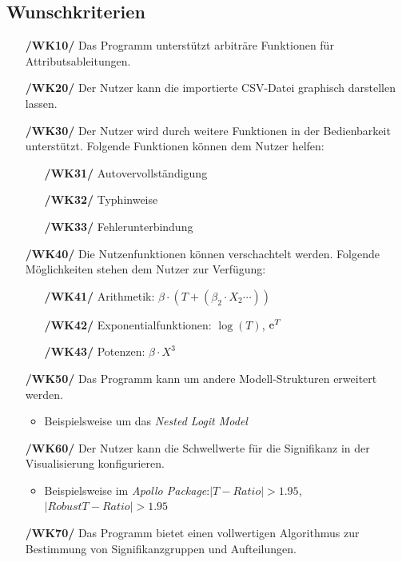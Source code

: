 \documentclass{article}
\begin{document}
\subsection{Wunschkriterien}
\begin{itemize}
    \item[\textbf{/WK10/}] Das Programm unterstützt arbiträre Funktionen für Attributsableitungen.
    \item[\textbf{/WK20/}] Der Nutzer kann die importierte CSV-Datei graphisch darstellen lassen.
    \item[\textbf{/WK30/}] Der Nutzer wird durch weitere Funktionen in der Bedienbarkeit unterstützt. \newline Folgende Funktionen können dem Nutzer helfen:
    \begin{itemize}[leftmargin=.7in]
        \item[\textbf{/WK31/}] Autovervollständigung
        \item[\textbf{/WK32/}] Typhinweise
        \item[\textbf{/WK33/}] Fehlerunterbindung
    \end{itemize}
    \item[\textbf{/WK40/}] Die Nutzenfunktionen können verschachtelt werden.
    \newline Folgende Möglichkeiten stehen dem Nutzer zur Verfügung:
    \begin{itemize}[leftmargin=.7in]
        \item[\textbf{/WK41/}] Arithmetik: $\beta \cdot (T + (\beta_2 \cdot X_2 \cdots))$
        \item[\textbf{/WK42/}] Exponentialfunktionen: $\log(T)$, ${\rm e}^T$
        \item[\textbf{/WK43/}] Potenzen: $\beta \cdot X^3$
    \end{itemize}
    \item[\textbf{/WK50/}] Das Programm kann um andere Modell-Strukturen erweitert werden.
    \begin{itemize}
        \item Beispielsweise um das \textit{Nested Logit Model}
    \end{itemize}
    \item[\textbf{/WK60/}] Der Nutzer kann die Schwellwerte für die Signifikanz in der Visualisierung konfigurieren.
    \begin{itemize}
        \item Beispielsweise im \textit{Apollo Package}:\newline $|T-Ratio | > 1.95$, $|Robust T-Ratio | > 1.95$
    \end{itemize}    
    \item[\textbf{/WK70/}] Das Programm bietet einen vollwertigen Algorithmus zur Bestimmung von Signifikanzgruppen und Aufteilungen.
\end{itemize}
\end{document}
